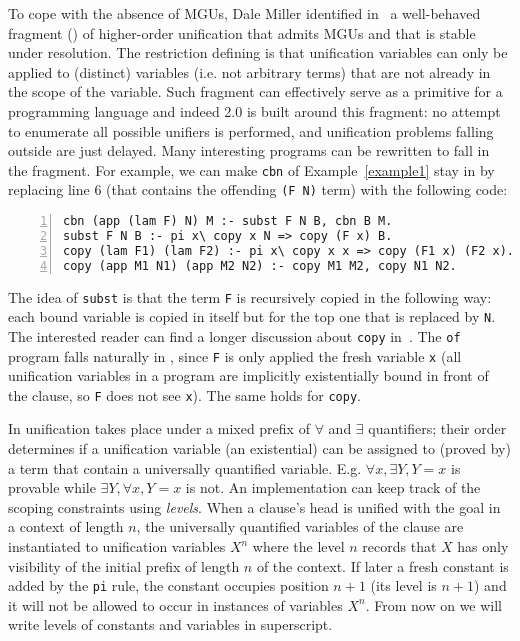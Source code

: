 \documentclass{llncs}
\begin{document}
To cope with the absence of MGUs, Dale Miller identified
in~\cite{Miller91alogic} a well-behaved fragment (\Ll{}) of higher-order
unification that admits MGUs and that is stable under \lp{} resolution. 
The restriction defining \Ll{} is that unification variables can
only be applied to (distinct) variables (i.e. not arbitrary terms) that are
not already in the scope of the variable.
Such fragment can effectively serve as a primitive for a
programming language and indeed \tedius{} 2.0 is built around this fragment:
no attempt to enumerate all possible unifiers is performed, and unification
problems falling outside \Ll{} are just delayed. Many interesting \lp{}
programs can be rewritten to fall in the fragment. For example, we can
make \verb+cbn+ of Example~\ref{example1} stay in \Ll{} by replacing
line 6 (that contains the offending \verb+(F N)+ term) with the following code:
\vspace{-0.4em}
\begin{center}
\small
\begin{minipage}{10cm}
\begin{Verbatim}[numbers=left,numbersep=1pt,frame=leftline]
cbn (app (lam F) N) M :- subst F N B, cbn B M.
subst F N B :- pi x\ copy x N => copy (F x) B.
copy (lam F1) (lam F2) :- pi x\ copy x x => copy (F1 x) (F2 x).
copy (app M1 N1) (app M2 N2) :- copy M1 M2, copy N1 N2.
\end{Verbatim}
\end{minipage}
\end{center}
\vspace{-0.3em}
The idea of \verb+subst+ is that the term \verb+F+ is recursively copied in
the following way: each bound variable is copied in itself but for the top one
that is replaced by \verb+N+.
The interested reader can find a longer discussion about \verb+copy+
in~\cite[page 199]{Miller:2012:PHL:2331097}.
The \verb+of+ program falls naturally in \Ll{}, since \verb+F+ is only applied
the fresh variable \verb+x+ (all unification variables in a \lp{} program are
implicitly existentially bound in front of the clause, so \verb+F+ does not
see \verb+x+). The same holds for \verb+copy+.

In \lp{} unification takes place under
a mixed prefix of $\forall$ and $\exists$ quantifiers; their order
determines if a unification variable (an existential) can be assigned to
(proved by) a term that contain a universally quantified variable.
E.g. $\forall x,\exists Y, Y = x$ is provable while
$\exists Y,\forall x, Y = x$ is not. An implementation can
keep track of the scoping constraints using \emph{levels}.
When a clause's head is unified with the goal in a context of length
$n$, the universally quantified variables of the clause are instantiated to
unification variables $X^n$ where the level $n$ records that $X$ has only
visibility of the initial prefix of length $n$ of the context.
If later a fresh constant is added by the \verb+pi+ rule, the constant
occupies position $n+1$ (its level is $n+1$) and it will not be allowed to
occur in instances of variables $X^n$.
From now on we will write levels of constants and variables in superscript.
\end{document}
